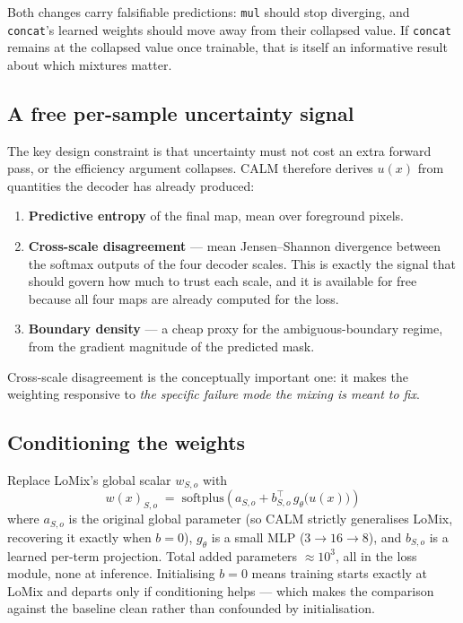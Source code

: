 \documentclass[11pt,a4paper]{article}
\newcommand{\code}[1]{\texttt{\small #1}}
\begin{document}
Both changes carry falsifiable predictions: \code{mul} should stop diverging,
and \code{concat}'s learned weights should move away from their collapsed value.
If \code{concat} remains at the collapsed value once trainable, that is itself
an informative result about which mixtures matter.

\subsection{A free per-sample uncertainty signal}

The key design constraint is that uncertainty must not cost an extra forward
pass, or the efficiency argument collapses. CALM therefore derives $u(x)$ from
quantities the decoder has already produced:

\begin{enumerate}
\item \textbf{Predictive entropy} of the final map, mean over foreground pixels.
\item \textbf{Cross-scale disagreement} --- mean Jensen--Shannon divergence
between the softmax outputs of the four decoder scales. This is exactly the
signal that should govern how much to trust each scale, and it is available for
free because all four maps are already computed for the loss.
\item \textbf{Boundary density} --- a cheap proxy for the ambiguous-boundary
regime, from the gradient magnitude of the predicted mask.
\end{enumerate}

Cross-scale disagreement is the conceptually important one: it makes the
weighting responsive to \emph{the specific failure mode the mixing is meant to
fix}.

\subsection{Conditioning the weights}

Replace LoMix's global scalar $w_{S,o}$ with
\[
  w(x)_{S,o} \;=\; \mathrm{softplus}\!\left( a_{S,o} + b_{S,o}^{\top}\,
  g_\theta\big(u(x)\big) \right)
\]
where $a_{S,o}$ is the original global parameter (so CALM strictly generalises
LoMix, recovering it exactly when $b = 0$), $g_\theta$ is a small MLP
($3 \to 16 \to 8$), and $b_{S,o}$ is a learned per-term projection. Total added
parameters ${\approx}10^3$, all in the loss module, none at inference.
Initialising $b = 0$ means training starts exactly at LoMix and departs only if
conditioning helps --- which makes the comparison against the baseline clean
rather than confounded by initialisation.
\end{document}
